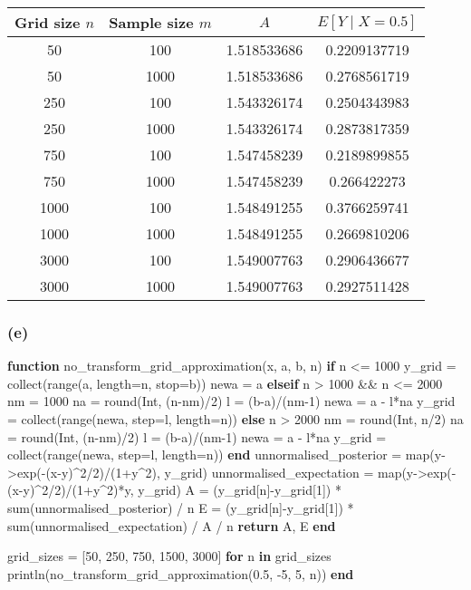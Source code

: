 \documentclass[]{article}
\newenvironment{Shaded}{\begin{snugshade}}{\end{snugshade}}
\newcommand{\KeywordTok}[1]{\textcolor[rgb]{0.13,0.29,0.53}{\textbf{#1}}}
\newcommand{\DataTypeTok}[1]{\textcolor[rgb]{0.13,0.29,0.53}{#1}}
\newcommand{\FloatTok}[1]{\textcolor[rgb]{0.00,0.00,0.81}{#1}}
\newcommand{\NormalTok}[1]{#1}
\begin{document}
\begin{longtable}[]{@{}cccc@{}}
\toprule
Grid size \(n\) & Sample size \(m\) & \(A\) &
\(E[Y\mid X=0.5]\)\tabularnewline
\midrule
\endhead
50 & 100 & 1.518533686 & 0.2209137719\tabularnewline
50 & 1000 & 1.518533686 & 0.2768561719\tabularnewline
250 & 100 & 1.543326174 & 0.2504343983\tabularnewline
250 & 1000 & 1.543326174 & 0.2873817359\tabularnewline
750 & 100 & 1.547458239 & 0.2189899855\tabularnewline
750 & 1000 & 1.547458239 & 0.266422273\tabularnewline
1000 & 100 & 1.548491255 & 0.3766259741\tabularnewline
1000 & 1000 & 1.548491255 & 0.2669810206\tabularnewline
3000 & 100 & 1.549007763 & 0.2906436677\tabularnewline
3000 & 1000 & 1.549007763 & 0.2927511428\tabularnewline
\bottomrule
\end{longtable}

\subsubsection{(e)}\label{e}

\begin{Shaded}
\begin{Highlighting}[]
\KeywordTok{function}\NormalTok{ no_transform_grid_approximation(x, a, b, n) }
  \KeywordTok{if}\NormalTok{ n <= }\FloatTok{1000}
\NormalTok{    y_grid = collect(range(a, length=n, stop=b))}
\NormalTok{    newa = a}
  \KeywordTok{elseif}\NormalTok{ n > }\FloatTok{1000}\NormalTok{ && n <= }\FloatTok{2000}
\NormalTok{    nm = }\FloatTok{1000}
\NormalTok{    na = round(}\DataTypeTok{Int}\NormalTok{, (n-nm)/}\FloatTok{2}\NormalTok{)}
\NormalTok{    l = (b-a)/(nm-}\FloatTok{1}\NormalTok{)}
\NormalTok{    newa = a - l*na}
\NormalTok{    y_grid = collect(range(newa, step=l, length=n))}
  \KeywordTok{else}\NormalTok{ n > }\FloatTok{2000}
\NormalTok{    nm = round(}\DataTypeTok{Int}\NormalTok{, n/}\FloatTok{2}\NormalTok{)}
\NormalTok{    na = round(}\DataTypeTok{Int}\NormalTok{, (n-nm)/}\FloatTok{2}\NormalTok{)}
\NormalTok{    l = (b-a)/(nm-}\FloatTok{1}\NormalTok{)}
\NormalTok{    newa = a - l*na}
\NormalTok{    y_grid = collect(range(newa, step=l, length=n))}
  \KeywordTok{end}
\NormalTok{  unnormalised_posterior = map(y->exp(-(x-y)^}\FloatTok{2}\NormalTok{/}\FloatTok{2}\NormalTok{)/(}\FloatTok{1}\NormalTok{+y^}\FloatTok{2}\NormalTok{), y_grid)}
\NormalTok{  unnormalised_expectation = map(y->exp(-(x-y)^}\FloatTok{2}\NormalTok{/}\FloatTok{2}\NormalTok{)/(}\FloatTok{1}\NormalTok{+y^}\FloatTok{2}\NormalTok{)*y, y_grid)}
\NormalTok{  A = (y_grid[n]-y_grid[}\FloatTok{1}\NormalTok{]) * sum(unnormalised_posterior) / n}
\NormalTok{  E = (y_grid[n]-y_grid[}\FloatTok{1}\NormalTok{]) * sum(unnormalised_expectation) / A / n}
  \KeywordTok{return}\NormalTok{ A, E}
\KeywordTok{end}

\NormalTok{grid_sizes = [}\FloatTok{50}\NormalTok{, }\FloatTok{250}\NormalTok{, }\FloatTok{750}\NormalTok{, }\FloatTok{1500}\NormalTok{, }\FloatTok{3000}\NormalTok{]}
\KeywordTok{for}\NormalTok{ n }\KeywordTok{in}\NormalTok{ grid_sizes}
\NormalTok{  println(no_transform_grid_approximation(}\FloatTok{0.5}\NormalTok{, -}\FloatTok{5}\NormalTok{, }\FloatTok{5}\NormalTok{, n))}
\KeywordTok{end}
\end{Highlighting}
\end{Shaded}
\end{document}
